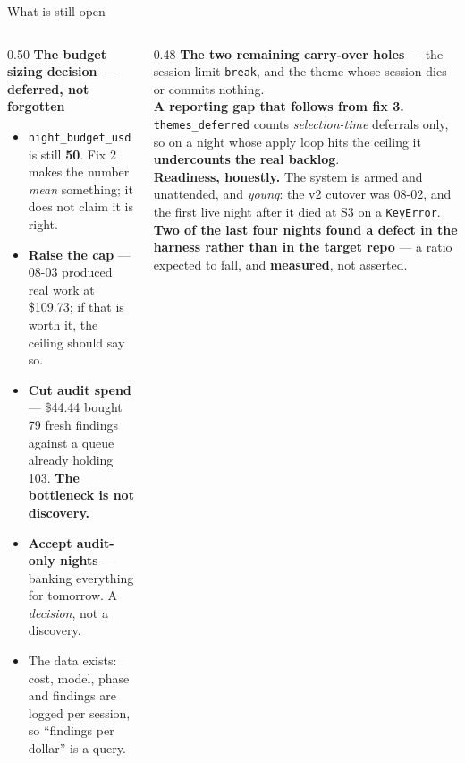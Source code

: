 \documentclass[aspectratio=169,11pt]{beamer}
\newcommand{\good}[1]{\textcolor{jsAccent}{\textbf{#1}}}
\newcommand{\warn}[1]{\textcolor{jsWarm}{\textbf{#1}}}
\begin{document}
\begin{frame}{What is still open}
  \footnotesize
  \begin{columns}[T]
    \begin{column}{0.50\textwidth}
      \textbf{The budget sizing decision --- deferred, not forgotten}
      \begin{itemize}
        \item \texttt{night\_budget\_usd} is still \textbf{50}. Fix 2 makes the number \emph{mean} something; it does not claim it is right.
        \item \textbf{Raise the cap} --- 08-03 produced real work at \$109.73; if that is worth it, the ceiling should say so.
        \item \textbf{Cut audit spend} --- \$44.44 bought 79 fresh findings against a queue already holding 103. \good{The bottleneck is not discovery.}
        \item \textbf{Accept audit-only nights} --- banking everything for tomorrow. A \emph{decision}, not a discovery.
        \item The data exists: cost, model, phase and findings are logged per session, so ``findings per dollar'' is a query.
      \end{itemize}
    \end{column}
    \begin{column}{0.48\textwidth}
      \textbf{The two remaining carry-over holes} --- the session-limit \texttt{break}, and the theme whose session dies or commits nothing.
      \vspace{0.5em}\\
      \textbf{A reporting gap that follows from fix 3.} \texttt{themes\_deferred} counts \emph{selection-time} deferrals only, so on a night whose apply loop hits the ceiling it \warn{undercounts the real backlog}.
      \vspace{0.5em}\\
      \textbf{Readiness, honestly.} The system is armed and unattended, and \emph{young}: the v2 cutover was 08-02, and the first live night after it died at S3 on a \texttt{KeyError}. \warn{Two of the last four nights found a defect in the harness rather than in the target repo} --- a ratio expected to fall, and \textbf{measured}, not asserted.
    \end{column}
  \end{columns}
\end{frame}
\end{document}
